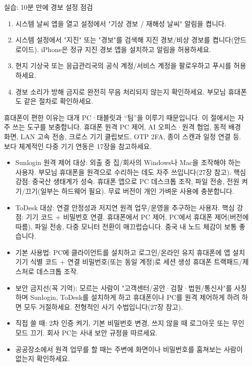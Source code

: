 \begin{tcbpractice}{실습: 10분 만에 경보 설정 점검}
\begin{enumerate}
  \item 시스템 날씨 앱을 열고 설정에서 "기상 경보 / 재해성 날씨" 알림을 켭니다.
  \item 시스템 설정에서 "지진" 또는 "경보"를 검색해 지진 경보/비상 경보를 켭니다(안드로이드). iPhone은 정규 지진 경보 앱을 설치하고 알림을 허용하세요.
  \item 현지 기상국 또는 응급관리국의 공식 계정/서비스 계정을 팔로우하고 푸시를 허용하세요.
  \item 경보 소리가 방해 금지로 완전히 무음 처리되지 않는지 확인하세요. 부모님 휴대폰도 같은 절차로 확인하세요.
\end{enumerate}

\end{tcbpractice}


휴대폰이 편한 이유는 대개 PC·태블릿과 “팀”을 이루기 때문입니다. 이 절에서는 자주 쓰는 도구를 보충합니다. 휴대폰 원격 PC 제어, AI 오피스·원격 협업, 동적 배경 화면, LAN 고속 전송, 크로스 기기 클립보드, OTP 2FA, 종이 스캔과 일정 연결 등. 보다 체계적인 다중 기기 연동은 17장을 참고하세요.


\begin{itemize}
  \item Sunlogin 원격 제어 대상: 외출 중 집/회사의 Windows나 Mac을 조작해야 하는 사용자. 부모님 휴대폰을 원격으로 수리하는 데도 자주 쓰입니다(27장 참고). 핵심 강점: 중국산 생태계가 성숙. 휴대폰 앱으로 PC 데스크톱 조작, 파일 전송, 전원 켜기/끄기(일부는 하드웨어 필요). 무료 버전이 개인 가벼운 사용에 충분합니다.
  \item ToDesk 대상: 연결 안정성과 저지연 원격 업무/운영을 추구하는 사용자. 핵심 강점: 기기 코드 + 비밀번호 연결. 휴대폰에서 PC 제어, PC에서 휴대폰 제어(버전에 따름), 파일 전송, 다중 모니터 전환이 매끄럽습니다. 중국 내 노드 체감이 보통 좋습니다.
  \item 기본 사용법: PC에 클라이언트를 설치하고 로그인/온라인 유지 휴대폰에 앱 설치 기기 식별 코드 + 연결 비밀번호(또는 동일 계정)로 세션 생성 휴대폰 트랙패드/제스처로 데스크톱 조작.
  \item 보안 금지선(꼭 기억): 모르는 사람이 "고객센터/공안·검찰·법원/통신사"를 사칭하며 Sunlogin, ToDesk를 설치하게 하고 휴대폰이나 PC를 원격 제어하게 하려 하면 모두 거절하세요. 전형적인 사기 수법입니다(27장 참고).
  \item 직접 쓸 때: 2차 인증 켜기, 기본 비밀번호 변경, 쓰지 않을 때 로그아웃 또는 무인 모드 끄기. 회사 PC는 사내 보안 규정을 따르세요.
  \item 공공장소에서 원격 업무를 할 때는 주변에 화면이나 비밀번호를 훔쳐보는 사람이 없는지 확인하세요.
\end{itemize}

